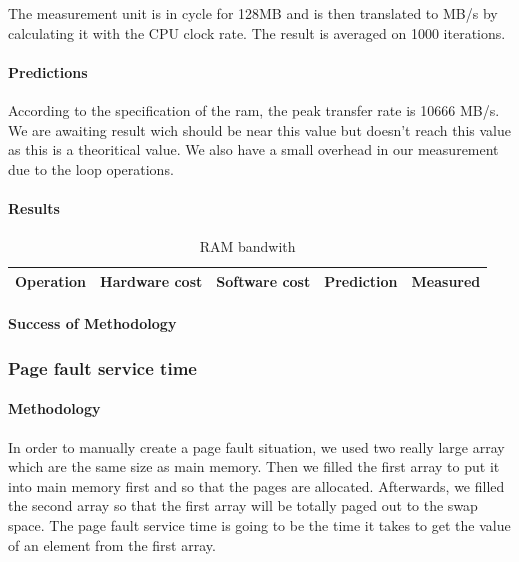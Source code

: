 The measurement unit is in cycle for 128MB and is then translated to MB/s by calculating it with the CPU clock rate.
The result is averaged on 1000 iterations.

\paragraph{Predictions}
According to the specification of the ram, the peak transfer rate is 10666 MB/s.
We are awaiting result wich should be near this value but doesn't reach this value as this is a theoritical value.
We also have a small overhead in our measurement due to the loop operations.

\paragraph{Results}
\begin{table}[h]
\begin{center}
\begin{tabular}{| l | l | l | l | l |}
\hline
Operation & Hardware cost & Software cost & Prediction & Measured \\
\hline
\end{tabular}
\end{center}

\caption{RAM bandwith\label{tab:ram-bandwith}}
\end{table}

\paragraph{Success of Methodology}




\subsubsection{Page fault service time}
\paragraph{Methodology}
In order to manually create a page fault situation, we used two really large array which are the same size as main memory.
Then we filled the first array to put it into main memory first and so that the pages are allocated.
Afterwards, we filled the second array so that the first array will be totally paged out to the swap space.
The page fault service time is going to be the time it takes to get the value of an element from the first array.

